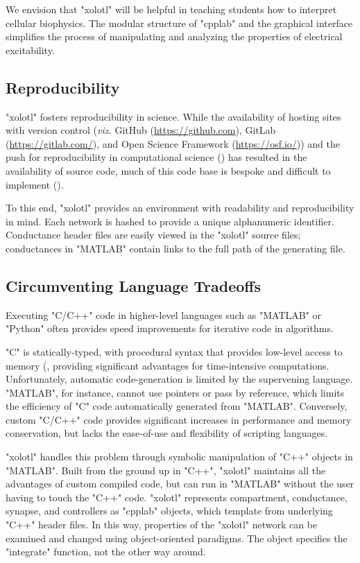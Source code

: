 \documentclass{frontiersSCNS} %
\newcommand{\viz}{\textit{viz.}\xspace}
\begin{document}
We envision that "xolotl" will be helpful in teaching students how to interpret cellular biophysics. The modular structure of "cpplab" and the graphical interface simplifies the process of manipulating and analyzing the properties of electrical excitability.

\subsection{Reproducibility}

"xolotl" fosters reproducibility in science. While the availability of hosting sites with version control (\viz GitHub (\url{https://github.com}), GitLab (\url{https://gitlab.com/}), and Open Science Framework (\url{https://osf.io/})) and the push for reproducibility in computational science (\cite{eklundClusterFailureWhy2016, stoddenEnhancingReproducibilityComputational2016, bakerWhyScientistsMust2016}) has resulted in the availability of source code, much of this code base is bespoke and difficult to implement (\cite{sedanoCodeReadabilityTesting2016, xuMeasurementSourceCode2017}).

To this end, "xolotl" provides an environment with readability and reproducibility in mind. Each network is hashed to provide a unique alphanumeric identifier. Conductance header files are easily viewed in the "xolotl" source files; conductances in "MATLAB" contain links to the full path of the generating file.

\subsection{Circumventing Language Tradeoffs}

Executing "C/C++" code in higher-level languages such as "MATLAB" or "Python" often provides speed improvements for iterative code in algorithms. 

"C" is statically-typed, with procedural syntax that provides low-level access to memory (\cite{kernighanProgrammingLanguage1978}, providing significant advantages for time-intensive computations. Unfortunately, automatic code-generation is limited by the supervening language. "MATLAB", for instance, cannot use pointers or pass by reference, which limits the efficiency of "C" code automatically generated from "MATLAB". Conversely, custom "C/C++" code provides significant increases in performance and memory conservation, but lacks the ease-of-use and flexibility of scripting languages.

"xolotl" handles this problem through symbolic manipulation of "C++" objects in "MATLAB". Built from the ground up in "C++", "xolotl" maintains all the advantages of custom compiled code, but can run in "MATLAB" without the user having to touch the "C++" code. "xolotl" represents compartment, conductance, synapse, and controllers as "cpplab" objects, which template from underlying "C++" header files. In this way, properties of the "xolotl" network can be examined and changed using object-oriented paradigms. The object specifies the "integrate" function, not the other way around.
\end{document}
